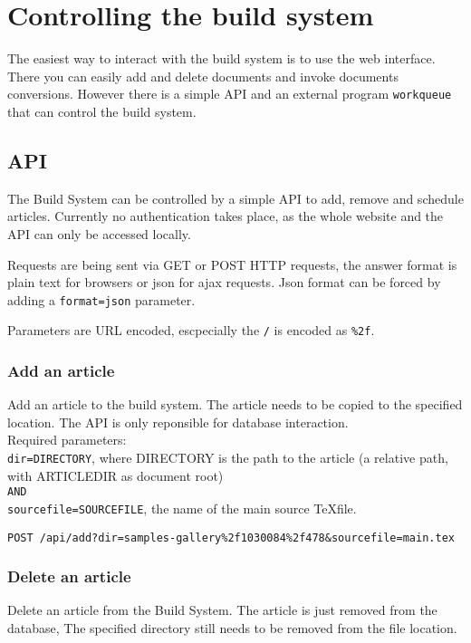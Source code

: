 \documentclass[a4paper]{article}
\begin{document}
\section{Controlling the build system}

The easiest way to interact with the build system is to use the web interface. There you can easily add and delete documents and invoke documents conversions. 
However there is a simple API and an external program \texttt{workqueue} that can control the build system. 

\subsection{API}

The Build System can be controlled by a simple API to add, remove and schedule articles. Currently no authentication takes place, as the whole website and the API can only be accessed locally.

Requests are being sent via GET or POST HTTP requests, the answer format is plain text for browsers or json for ajax requests. Json format can be forced by adding a \texttt{format=json} parameter.

Parameters are URL encoded, escpecially the \texttt{/} is encoded as \texttt{\%2f}.
\subsubsection{Add an article}
Add an article to the build system. The article needs to be copied to the specified location. The API is only reponsible for database interaction.\\

Required parameters:\\
\texttt{dir=DIRECTORY}, where DIRECTORY is the path to the article (a relative path, with ARTICLEDIR as document root)\\
\texttt{AND}\\
\texttt{sourcefile=SOURCEFILE}, the name of the main source \TeX file.

\begin{verbatim}
POST /api/add?dir=samples-gallery%2f1030084%2f478&sourcefile=main.tex
\end{verbatim}

\subsubsection{Delete an article}
Delete an article from the Build System. The article is just removed from the database, The specified directory still needs to be removed from the file location. 
\end{document}
